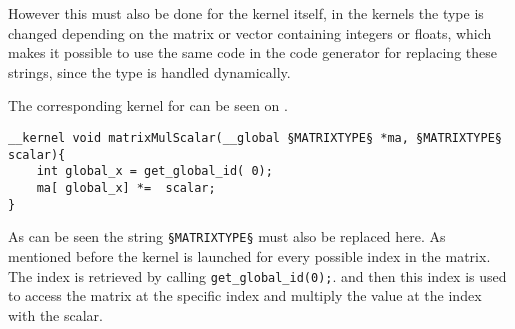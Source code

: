 However this must also be done for the kernel itself, in the kernels the type is changed depending on the matrix or vector containing integers or floats, which makes it possible to use the same code in the code generator for replacing these strings, since the type is handled dynamically.

The corresponding kernel for  can be seen on .
\begin{lstlisting}[caption=Kernel code for multiplying a matrix or vector with a scalar.,numbers=none,frame=tlrb,label={lst:kernel}]
__kernel void matrixMulScalar(__global §MATRIXTYPE§ *ma, §MATRIXTYPE§ scalar){
	int global_x = get_global_id( 0);
	ma[ global_x] *=  scalar;
}
\end{lstlisting}

As can be seen the string \texttt{§MATRIXTYPE§} must also be replaced here.
As mentioned before the kernel is launched for every possible index in the matrix.
The index is retrieved by calling \texttt{get\_global\_id(0);}.
and then this index is used to access the matrix at the specific index and multiply the value at the index with the scalar.

